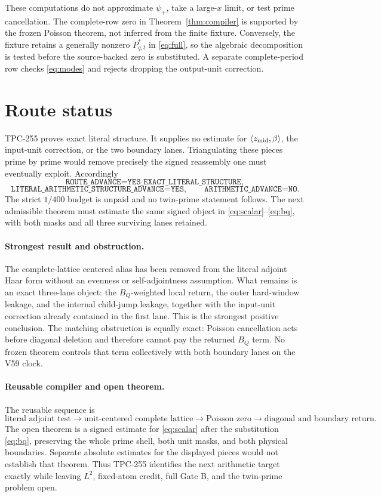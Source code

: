 \documentclass[10pt]{article}
\newcommand{\ip}[2]{\langle #1,#2\rangle}
\newcommand{\zm}{z_{\rm mid}}
\begin{document}
These computations do not approximate $\psi_+$, take a large-$x$ limit, or
test prime cancellation.  The complete-row zero in Theorem~\ref{thm:compiler}
is supported by the frozen Poisson theorem, not inferred from the finite
fixture.  Conversely, the fixture retains a generally nonzero $P^*_{q,t}$ in
\eqref{eq:full}, so the algebraic decomposition is tested before the
source-backed zero is substituted.  A separate complete-period row checks
\eqref{eq:modes} and rejects dropping the output-unit correction.

\section{Route status}

TPC-255 proves exact literal structure.  It supplies no estimate for
$\ip{\zm}{\beta}$, the input-unit correction, or the two boundary lanes.
Triangulating these pieces prime by prime would remove precisely the signed
reassembly one must eventually exploit.  Accordingly
\[
 \texttt{ROUTE\_ADVANCE=YES\_EXACT\_LITERAL\_STRUCTURE},
\]
\[
 \texttt{LITERAL\_ARITHMETIC\_STRUCTURE\_ADVANCE=YES},\qquad
 \texttt{ARITHMETIC\_ADVANCE=NO}.
\]
The strict $1/400$ budget is unpaid and no twin-prime statement follows.
The next admissible theorem must estimate the same signed object in
\eqref{eq:scalar}--\eqref{eq:bq}, with both masks and all three surviving
lanes retained.

\paragraph{Strongest result and obstruction.}
The complete-lattice centered alias has been removed from the literal
adjoint Haar form without an evenness or self-adjointness assumption.  What
remains is an exact three-lane object: the $B_Q$-weighted local return, the
outer hard-window leakage, and the internal child-jump leakage, together with
the input-unit correction already contained in the first lane.  This is the
strongest positive conclusion.  The matching obstruction is equally exact:
Poisson cancellation acts before diagonal deletion and therefore cannot pay
the returned $B_Q$ term.  No frozen theorem controls that term collectively
with both boundary lanes on the V59 clock.

\paragraph{Reusable compiler and open theorem.}
The reusable sequence is
\[
 \text{literal adjoint test}
 \longrightarrow \text{unit-centered complete lattice}
 \longrightarrow \text{Poisson zero}
 \longrightarrow \text{diagonal and boundary return}.
\]
The open theorem is a signed estimate for \eqref{eq:scalar} after the
substitution \eqref{eq:bq}, preserving the whole prime shell, both unit masks,
and both physical boundaries.  Separate absolute estimates for the displayed
pieces would not establish that theorem.  Thus TPC-255 identifies the next
arithmetic target exactly while leaving $L^2$, fixed-atom credit, full Gate B,
and the twin-prime problem open.



\end{document}
